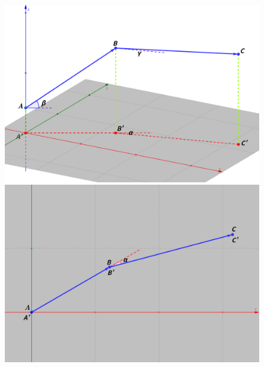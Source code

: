 \documentclass[utf8]{ctexart} %
\numberwithin{figure}{section}
\numberwithin{equation}{section}
\begin{document}
	 \begin{figure}[ht]
	 	\centering
	 	
	 	\begin{minipage}[b]{0.33\textwidth} %
	 		\centering
	 		\includegraphics[width=\textwidth]{figures/explain_angle_main.png}
	 	\end{minipage}\hfill
	 	\begin{minipage}[b]{0.33\textwidth} %
	 		\centering
	 		\includegraphics[width=\textwidth]{figures/explain_angle_top.png}
	 	\end{minipage}
 	\begin{minipage}[b]{0.33\textwidth} %
 		\centering

\end{minipage}
\end{figure}
\end{document}
